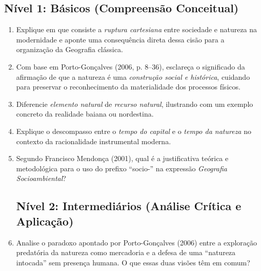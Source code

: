 
\subsection*{Nível 1: Básicos (Compreensão Conceitual)}

\begin{enumerate}[leftmargin=1.8em, itemsep=4pt]
  \item Explique em que consiste a \emph{ruptura cartesiana} entre sociedade e natureza na modernidade e aponte uma consequência direta dessa cisão para a organização da Geografia clássica.
  \espacoResolucao[1.8cm]

  \item Com base em Porto-Gonçalves (2006, p. 8--36), esclareça o significado da afirmação de que a natureza é uma \emph{construção social e histórica}, cuidando para preservar o reconhecimento da materialidade dos processos físicos.
  \espacoResolucao[1.8cm]

  \item Diferencie \emph{elemento natural} de \emph{recurso natural}, ilustrando com um exemplo concreto da realidade baiana ou nordestina.
  \espacoResolucao[1.8cm]

  \item Explique o descompasso entre o \emph{tempo do capital} e o \emph{tempo da natureza} no contexto da racionalidade instrumental moderna.
  \espacoResolucao[1.8cm]

  \item Segundo Francisco Mendonça (2001), qual é a justificativa teórica e metodológica para o uso do prefixo ``socio-'' na expressão \emph{Geografia Socioambiental}?
  \espacoResolucao[1.8cm]

\subsection*{Nível 2: Intermediários (Análise Crítica e Aplicação)}

  \item Analise o paradoxo apontado por Porto-Gonçalves (2006) entre a exploração predatória da natureza como mercadoria e a defesa de uma ``natureza intocada'' sem presença humana. O que essas duas visões têm em comum?
  \espacoResolucao[1.8cm]


\end{enumerate}
